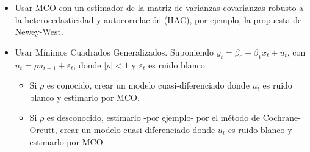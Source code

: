 \documentclass[10pt, a4paper, landscape]{article}
\begin{document}
\begin{multicols}{3}
\begin{itemize}[leftmargin=*]
	\item Usar MCO con un estimador de la matriz de varianzas-covarianzas robusto a la heterocedasticidad y autocorrelación (HAC), por ejemplo, la propuesta de Newey-West.
	\item Usar Mínimos Cuadrados Generalizados. Suponiendo \( y_{t} = \beta_{0} + \beta_{1} x_{t} + u_{t} \), con \( u_{t} = \rho u_{t - 1} + \varepsilon_{t} \), donde \( \lvert \rho \rvert < 1 \) y \( \varepsilon_{t} \) es ruido blanco.
	\begin{itemize}[leftmargin=*]
		\item Si \( \rho \) es conocido, crear un modelo cuasi-diferenciado donde \( u_{t} \) es ruido blanco y estimarlo por MCO.
		\item Si \( \rho \) es desconocido, estimarlo -por ejemplo- por el método de Cochrane-Orcutt, crear un modelo cuasi-diferenciado donde \( u_{t} \) es ruido blanco y estimarlo por MCO.
	\end{itemize}
\end{itemize}

\end{multicols}
\end{document}
